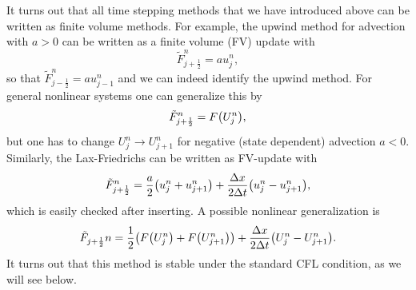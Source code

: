 \begin{example}
	It turns out that all time stepping methods that we have introduced above can be written as finite volume methods.
	For example, the upwind method for advection with \(a > 0\) can be written as a finite volume (FV) update with
	\[
		\tilde{F}_{j + \frac{1}{2}}^n = au_j^n,
	\]
	so that \(\tilde{F}_{j - \frac{1}{2}}^n = au_{j - 1}^n\) and we can indeed identify the upwind method.
	For general nonlinear systems one can generalize this by
	\[
		\tilde{F}_{j + \frac{1}{2}}^n = F\parentheses*{U_j^n},
	\]
	but one has to change \(U_j^n \to U_{j + 1}^n\) for negative (state dependent) advection \(a < 0\).
	Similarly, the Lax-Friedrichs can be written as FV-update with
	\[
		\tilde{F}_{j + \frac{1}{2}}^n = \frac{a}{2}\parentheses*{u_j^n + u_{j + 1}^n} + \frac{\Delta x}{2\Delta t}\parentheses*{u_j^n - u_{j + 1}^n},
	\]
	which is easily checked after inserting.
	A possible nonlinear generalization is
	\[
		\tilde{F}_{j + \frac{1}{2}} n = \frac{1}{2}\parentheses*{F\parentheses*{U_j^n} + F\parentheses*{U_{j + 1}^n}} + \frac{\Delta x}{2\Delta t}\parentheses*{U_j^n - U_{j + 1}^n}.
	\]
	It turns out that this method is stable under the standard CFL condition, as we will see below.
\end{example}

